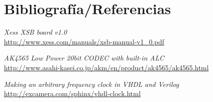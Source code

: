 \section{Bibliografía/Referencias}

\renewcommand*{\refname}{}


\begin{thebibliography}{9}


	\emph{Xess XSB board v1.0}\\
	\url{http://www.xess.com/manuals/xsb-manual-v1_0.pdf}
 

	\emph{AK4565 Low Power 20bit CODEC with built-in ALC}\\
	\url{http://www.asahi-kasei.co.jp/akm/en/product/ak4565/ak4565.html}

	\emph{Making an arbitrary frequency clock in VHDL and Verilog}\\
	\url{http://excamera.com/sphinx/vhdl-clock.html}


\end{thebibliography}
